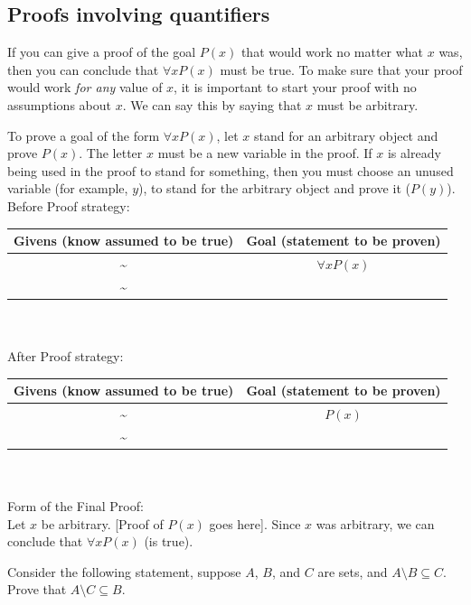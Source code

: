 \documentclass[../setup.tex]{subfiles}
\begin{document}
\subsection{Proofs involving quantifiers}
If you can give a proof of the goal $P(x)$ that would work no matter what $x$ was, then you can conclude that $\forall{x}P(x)$ must be true. To make sure that your proof would work \textit{for any} value of $x$, it is important to start your proof with no assumptions about $x$. We can say this by saying that $x$ must be arbitrary. \\
\begin{theorem}
	To prove a goal of the form $\forall{x}P(x)$, let $x$ stand for an arbitrary object and prove $P(x)$. The letter $x$ must be a new variable in the proof. If $x$ is already being used in the proof to stand for something, then you must choose an unused variable (for example, $y$), to stand for the arbitrary object and prove it ($P(y)$). \\
	Before Proof strategy:
	\begin{center}
	\begin{tabular}[t]{| c | c |}
		\hline
		Givens (know assumed to be true) & Goal (statement to be proven) \\
		\hline
		\textasciitilde & $\forall{x}P(x)$\\
		\textasciitilde & \\
		\hline
	\end{tabular}
	\end{center}
	\phantom \\ \\
	After Proof strategy:
	\begin{center}
	\begin{tabular}[t]{| c | c |}
		\hline
		Givens (know assumed to be true) & Goal (statement to be proven) \\
		\hline
		\textasciitilde & $P(x)$\\
		\textasciitilde & \\
		\hline
	\end{tabular}
	\end{center}
	\phantom \\ \\
	Form of the Final Proof: \\
	Let $x$ be arbitrary. [Proof of $P(x)$ goes here]. Since $x$ was arbitrary, we can conclude that $\forall{x}P(x)$ (is true).
\end{theorem}
Consider the following statement, suppose $A$, $B$, and $C$ are sets, and $A \setminus B \subseteq C$. Prove that $A \setminus C \subseteq B$. \\
\end{document}
